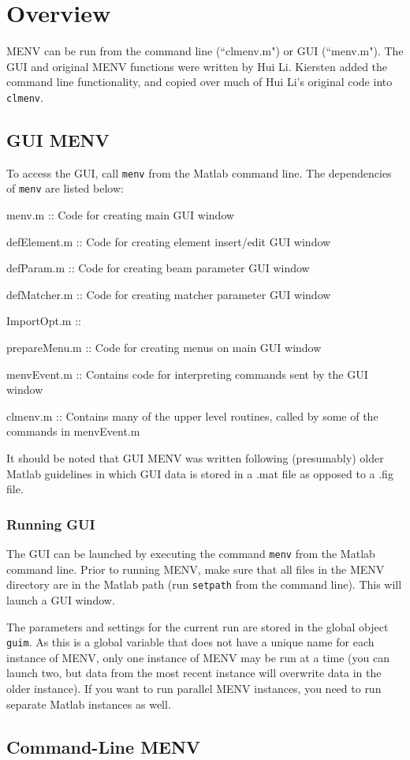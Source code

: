 \documentclass[../menv_main.tex]{subfiles}
\begin{document}
\section{Overview}

MENV can be run from the command line (``clmenv.m") or GUI (``menv.m"). The GUI and original MENV functions were written by Hui Li. Kiersten added the command line functionality, and copied over much of Hui Li's original code into \verb|clmenv|. 

\subsection{GUI MENV}

To access the GUI, call \verb|menv| from the Matlab command line. The dependencies of \verb|menv| are listed below:

\begin{itemized}
\item menv.m :: Code for creating main GUI window
\item defElement.m :: Code for creating element insert/edit GUI window
\item defParam.m :: Code for creating beam parameter GUI window
\item defMatcher.m :: Code for creating matcher parameter GUI window
\item ImportOpt.m :: 
\item prepareMenu.m :: Code for creating menus on main GUI window
\item menvEvent.m :: Contains code for interpreting commands sent by the GUI window
\item clmenv.m :: Contains many of the upper level routines, called by some of the commands in menvEvent.m
\end{itemized}

It should be noted that GUI MENV was written following (presumably) older Matlab guidelines in which GUI data is stored in a .mat file as opposed to a .fig file.

\subsubsection{Running GUI}

The GUI can be launched by executing the command \verb|menv| from the Matlab command line. Prior to running MENV, make sure that all files in the MENV directory are in the Matlab path (run \verb|setpath| from the command line). This will launch a GUI window.

The parameters and settings for the current run are stored in the global object \verb|guim|. As this is a global variable that does not have a unique name for each instance of MENV, only one instance of MENV may be run at a time (you can launch two, but data from the most recent instance will overwrite data in the older instance). If you want to run parallel MENV instances, you need to run separate Matlab instances as well.


\subsection{Command-Line MENV}
\end{document}
